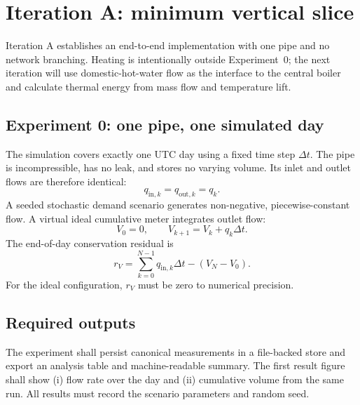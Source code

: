\documentclass[11pt,a4paper]{article}
\begin{document}
\section{Iteration A: minimum vertical slice}
Iteration A establishes an end-to-end implementation with one pipe and no
network branching. Heating is intentionally outside Experiment~0; the next
iteration will use domestic-hot-water flow as the interface to the central
boiler and calculate thermal energy from mass flow and temperature lift.

\subsection{Experiment 0: one pipe, one simulated day}
The simulation covers exactly one UTC day using a fixed time step $\Delta t$.
The pipe is incompressible, has no leak, and stores no varying volume. Its inlet
and outlet flows are therefore identical:
\begin{equation}
  q_{\mathrm{in},k}=q_{\mathrm{out},k}=q_k.
\end{equation}
A seeded stochastic demand scenario generates non-negative, piecewise-constant
flow. A virtual ideal cumulative meter integrates outlet flow:
\begin{equation}
  V_0=0, \qquad V_{k+1}=V_k + q_k\Delta t.
\end{equation}
The end-of-day conservation residual is
\begin{equation}
  r_V = \sum_{k=0}^{N-1}q_{\mathrm{in},k}\Delta t
        -\left(V_N-V_0\right).
\end{equation}
For the ideal configuration, $r_V$ must be zero to numerical precision.

\subsection{Required outputs}
The experiment shall persist canonical measurements in a file-backed store and
export an analysis table and machine-readable summary. The first result figure
shall show (i) flow rate over the day and (ii) cumulative volume from the same
run. All results must record the scenario parameters and random seed.
\end{document}
